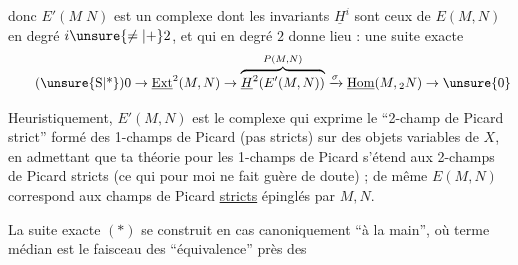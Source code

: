 \margin{\mbox{-- --}}

donc $E'(M\;N)$ est un complexe dont les invariants $\underline{H}^{i}$ sont ceux de $E(M,N)$ en degré $i\unsure{\ne|+}2$, et qui en degré $2$ donne lieu : une suite exacte
\begingroup
\makeatletter\tagsleft@true\makeatother
\[
\tag*{(\unsure{S|*})}
0\to\underline{\mathrm{Ext}}^{2}(M,N)\to
\overbrace{\underline{H}^{2}\!\left(E'(M,N)\right)}^{P(M,N)}
\xrightarrow{\sigma}\underline{\mathrm{Hom}}(M,{}_{2}N)\to \unsure{0}
\]
\endgroup

Heuristiquement, $E'(M,N)$ est le complexe qui exprime le ``2-champ de Picard strict'' formé des 1-champs de Picard (pas  stricts)  sur des objets variables de $X$, en admettant que ta théorie pour les 1-champs de Picard  s'étend aux 2-champs de Picard stricts (ce qui pour \unsure{,} moi ne fait guère de doute) ; de même $E(M,N)$ correspond aux champs de Picard \uline{stricts} épinglés par $M,N$.

La suite exacte $(*)$ se construit en  cas canoniquement ``à la main'', où  terme médian est le faisceau des   ``équivalence'' près des

